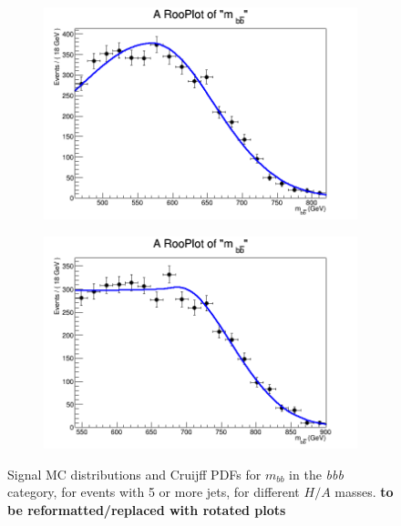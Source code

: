 \begin{figure}[phtb!]
\begin{center}
  \begin{subfigure}[$m_{A}=700$ GeV]{0.4\textwidth}\includegraphics[width=\textwidth]{FitResults/images/fitMC_bAbb700_3.png}\end{subfigure}
  \begin{subfigure}[$m_{A}=800$ GeV]{0.4\textwidth}\includegraphics[width=\textwidth]{FitResults/images/fitMC_bAbb800_3.png}\end{subfigure}
  \caption{Signal MC distributions and Cruijff PDFs for $m_{bb}$ in the {\it bbb} category, for events with 5 or more jets, for different $H/A$ masses. \textbf{to be reformatted/replaced with rotated plots} \label{fig:signalPDFs_5j}}
    \end{center}
\end{figure}








